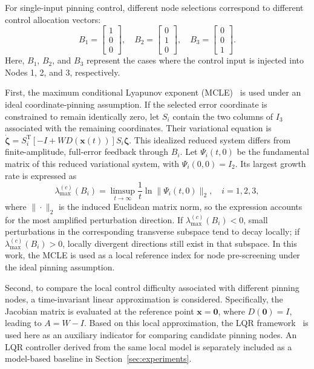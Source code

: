 \documentclass[a4paper,fleqn]{cas-dc}
\theoremstyle{plain}
\theoremstyle{definition}
\begin{document}
For single-input pinning control, different node selections correspond to different control allocation vectors:
\begin{equation}
	B_1=
	\begin{bmatrix}
		1\\0\\0
	\end{bmatrix},
	\quad
	B_2=
	\begin{bmatrix}
		0\\1\\0
	\end{bmatrix},
	\quad
	B_3=
	\begin{bmatrix}
		0\\0\\1
	\end{bmatrix}.
	\label{eq:pinning_vectors}
\end{equation}
Here, $B_1$, $B_2$, and $B_3$ represent the cases where the control input is injected into Nodes 1, 2, and 3, respectively.

First, the maximum conditional Lyapunov exponent (MCLE)~\cite{pecora1998master} is used under an ideal coordinate-pinning assumption. If the selected error coordinate is constrained to remain identically zero, let $S_i$ contain the two columns of $I_3$ associated with the remaining coordinates. Their variational equation is $\dot{\boldsymbol\zeta}=S_i^{\mathrm T}[-I+WD(\mathbf x(t))]S_i\boldsymbol\zeta$. This idealized reduced system differs from finite-amplitude, full-error feedback through $B_i$. Let $\Psi_i(t,0)$ be the fundamental matrix of this reduced variational system, with $\Psi_i(0,0)=I_2$. Its largest growth rate is expressed as
\begin{equation}
	\lambda_{\max}^{(c)}(B_i)
	=
	\limsup_{t\to\infty}
	\frac{1}{t}
	\ln
	\|\Psi_i(t,0)\|_2,
	\quad i=1,2,3,
	\label{eq:mcle}
\end{equation}
where $\|\cdot\|_2$ is the induced Euclidean matrix norm, so the expression accounts for the most amplified perturbation direction. If $\lambda_{\max}^{(c)}(B_i)<0$, small perturbations in the corresponding transverse subspace tend to decay locally; if $\lambda_{\max}^{(c)}(B_i)>0$, locally divergent directions still exist in that subspace. In this work, the MCLE is used as a local reference index for node pre-screening under the ideal pinning assumption.

Second, to compare the local control difficulty associated with different pinning nodes, a time-invariant linear approximation is considered. Specifically, the Jacobian matrix is evaluated at the reference point $\mathbf{x}=\mathbf{0}$, where $D(\mathbf{0})=I$, leading to $A=W-I$. Based on this local approximation, the LQR framework~\cite{willems2003least} is used here as an auxiliary indicator for comparing candidate pinning nodes. An LQR controller derived from the same local model is separately included as a model-based baseline in Section~\ref{sec:experiments}.
\end{document}
